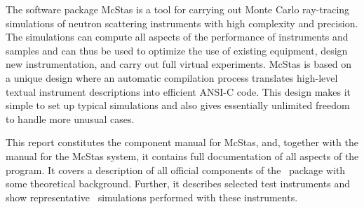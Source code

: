 The software package McStas is a tool for carrying out Monte Carlo
ray-tracing simulations of neutron scattering instruments with high
complexity and precision. The simulations can compute all aspects of the
performance of instruments and samples 
and can thus be used to optimize the use of existing equipment, 
design new instrumentation, and carry out full virtual experiments. 
McStas is based on a unique design where an automatic compilation process
translates high-level textual instrument descriptions into efficient
ANSI-C code. This design makes it simple to set up typical simulations
and also gives essentially unlimited freedom to handle more unusual
cases.

This report constitutes the component manual for McStas, and,
together with the manual for the McStas system, it
contains full documentation of all aspects of the program. It covers
a description of all official components of the \MCS\ package with
some theoretical background. Further, it describes selected test
instruments and show representative \MCS\ simulations performed with these
instruments.
